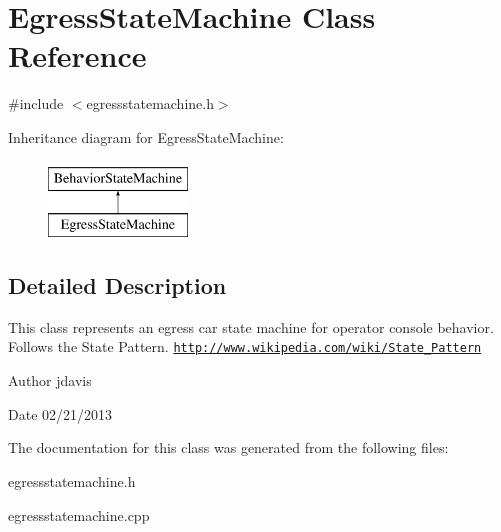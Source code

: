 \hypertarget{classEgressStateMachine}{\section{Egress\-State\-Machine Class Reference}
\label{classEgressStateMachine}
}


{\ttfamily \#include $<$egressstatemachine.\-h$>$}

Inheritance diagram for Egress\-State\-Machine\-:\begin{figure}[H]
\begin{center}
\leavevmode
\includegraphics[height=2.000000cm]{classEgressStateMachine}
\end{center}
\end{figure}


\subsection{Detailed Description}
This class represents an egress car state machine for operator console behavior. Follows the State Pattern. \href{http://www.wikipedia.com/wiki/State_Pattern}{\tt http\-://www.\-wikipedia.\-com/wiki/\-State\-\_\-\-Pattern}

\begin{DoxyAuthor}{Author}
jdavis 
\end{DoxyAuthor}
\begin{DoxyDate}{Date}
02/21/2013 
\end{DoxyDate}


The documentation for this class was generated from the following files\-:\begin{DoxyCompactItemize}
\item 
egressstatemachine.\-h\item 
egressstatemachine.\-cpp\end{DoxyCompactItemize}
